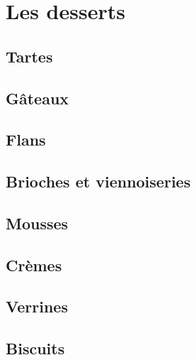 \documentclass[A4paper,twoside, 12pt]{book}
\begin{document}
\part{Les desserts}
	\chapter{Tartes}


	\chapter{G\^ateaux}







		
	\chapter{Flans}


	\chapter{Brioches et viennoiseries}




	\chapter{Mousses}
	\chapter{Cr\`emes}


	\chapter{Verrines}
	
	\chapter{Biscuits}




\end{document}
